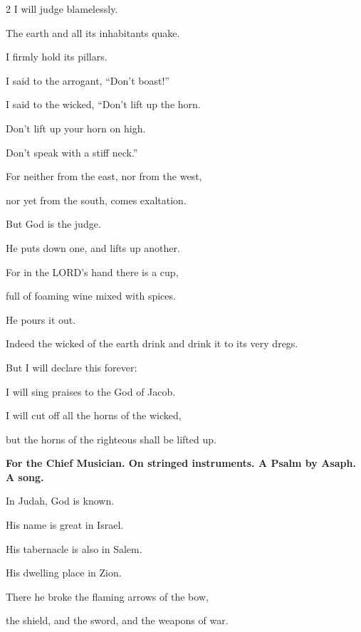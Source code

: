 \begin{multicols}{2}
	I will judge blamelessly.
	
	
	\myverse{}The earth and all its inhabitants quake.
	
	I firmly hold its pillars.
	\vspace{\baselineskip}
	
	
	\myverse{}I said to the arrogant, “Don’t boast!”
	
	I said to the wicked, “Don’t lift up the horn.
	
	
	\myverse{}Don’t lift up your horn on high.
	
	Don’t speak with a stiff neck.”
	
	
	\myverse{}For neither from the east, nor from the west,
	
	nor yet from the south, comes exaltation.
	
	
	\myverse{}But God is the judge.
	
	He puts down one, and lifts up another.
	
	
	\myverse{}For in the LORD’s hand there is a cup,
	
	full of foaming wine mixed with spices.
	
	He pours it out.
	
	Indeed the wicked of the earth drink and drink it to its very dregs.
	
	\vspace{\baselineskip}
	
	\myverse{}But I will declare this forever:
	
	I will sing praises to the God of Jacob.
	
	
	\myverse{}I will cut off all the horns of the wicked,
	
	but the horns of the righteous shall be lifted up.
	
	
	
	\mychapter{}\textbf{For the Chief Musician. On stringed instruments. A Psalm by Asaph. A song.}
	
	\myverse*{}In Judah, God is known.
	
	His name is great in Israel.
	
	
	\myverse{}His tabernacle is also in Salem.
	
	His dwelling place in Zion.
	
	
	\myverse{}There he broke the flaming arrows of the bow,
	
	the shield, and the sword, and the weapons of war.
	
	\vspace{\baselineskip}
	

\end{multicols}
